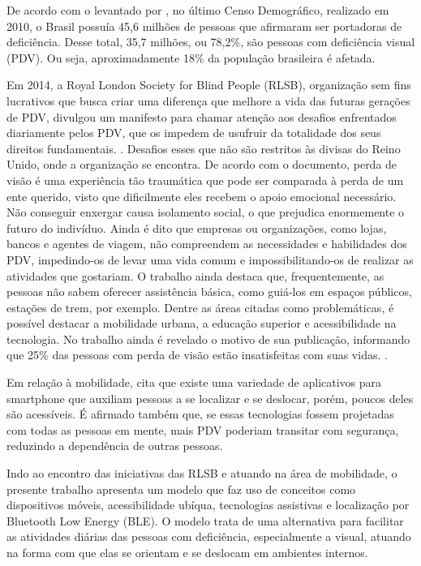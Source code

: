 \documentclass[twoside,english,brazilian]{UNISINOSartigo}
\begin{document}
De acordo com o levantado por , no último Censo Demográfico, realizado em 2010, o Brasil possuía 45,6 milhões de pessoas que afirmaram ser portadoras de deficiência. Desse total, 35,7 milhões, ou 78,2\%, são pessoas com deficiência visual (PDV). Ou seja, aproximadamente 18\% da população brasileira é afetada.

Em 2014, a Royal London Society for Blind People (RLSB), organização sem fins lucrativos que busca criar uma diferença que melhore a vida das futuras gerações de PDV, divulgou um manifesto para chamar atenção aos desafios enfrentados diariamente pelos PDV, que os impedem de usufruir da totalidade dos seus direitos fundamentais. \cite{YouthManifesto}. Desafios esses que não são restritos às divisas do Reino Unido, onde a organização se encontra.
De acordo com o documento, perda de visão é uma experiência tão traumática que pode ser comparada à perda de um ente querido, visto que dificilmente eles recebem o apoio emocional necessário. Não conseguir enxergar causa isolamento social, o que prejudica enormemente o futuro do indivíduo. Ainda é dito que empresas ou organizações, como lojas, bancos e agentes de viagem, não compreendem as necessidades e habilidades dos PDV, impedindo-os de levar uma vida comum e impossibilitando-os de realizar as atividades que gostariam. O trabalho ainda destaca que, frequentemente, as pessoas não sabem oferecer assistência básica, como guiá-los em espaços públicos, estações de trem, por exemplo. Dentre as áreas citadas como problemáticas, é possível destacar a mobilidade urbana, a educação superior e acessibilidade na tecnologia. No trabalho ainda é revelado o motivo de sua publicação, informando que 25\% das pessoas com perda de visão estão insatisfeitas com suas vidas. \cite{YouthManifesto}.

Em relação à mobilidade,  cita que existe uma variedade de aplicativos para smartphone que auxiliam pessoas a se localizar e se deslocar, porém, poucos deles são acessíveis. É afirmado também que, se essas tecnologias fossem projetadas com todas as pessoas em mente, mais PDV poderiam transitar com segurança, reduzindo a dependência de outras pessoas.

Indo ao encontro das iniciativas das RLSB e atuando na área de mobilidade, o presente trabalho apresenta um modelo que faz uso de conceitos como dispositivos móveis, acessibilidade ubíqua, tecnologias assistivas e localização por Bluetooth Low Energy (BLE). O modelo trata de uma alternativa para facilitar as atividades diárias das pessoas com deficiência, especialmente a visual, atuando na forma com que elas se orientam e se deslocam em ambientes internos.
\end{document}
